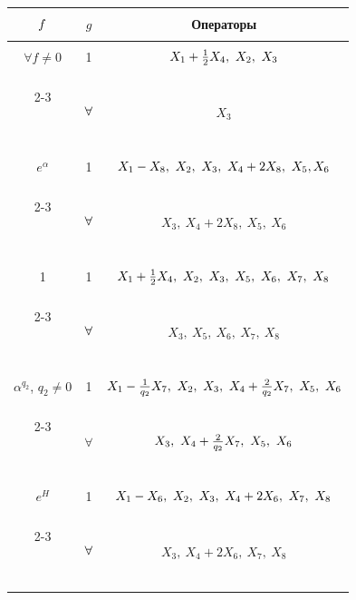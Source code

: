 \begin{center} 


\begin{tabular}{|c|c|c|} 


\hline 


$\myrule f$ & $g$ & Операторы \\ 


\hline 


$\forall f\ne0$ & 1 & $\myrule X_1+\frac12 X_4,\ X_2,\ X_3$ \\


\cline{2-3}


\ & $\myrule \forall$ & $X_3$\\


\hline


%


$e^\alpha$ & 1 & $\myrule X_1-X_8,\ X_2,\ X_3,\ X_4+2X_8,\ X_5, X_6$ \\


\cline{2-3} 


\ & $\myrule \forall$ & $X_3,\ X_4+2X_8,\ X_5,\ X_6$\\


\hline


%


1 & 1 & $\myrule X_1+\frac12 X_4,\ X_2,\ X_3,\ X_5,\ X_6,\ X_7,\ X_8$\\


\cline{2-3}


\ & $\myrule \forall$ & $X_3,\ X_5,\ X_6,\ X_7,\ X_8$\\


\hline


%


$\alpha^{q_2}$, $q_2\ne0$ & 1 &


$\myrule


X_1-\frac{1}{q_2}X_7,\ X_2,\ X_3,\ X_4+\frac{2}{q_2}X_7,\ X_5,\ X_6$ \\


\cline{2-3}


\ & $\forall$ & $\myrule X_3,\ X_4+\frac{2}{q_2}X_7,\ X_5,\ X_6$\\


\hline


%


$e^H$ & 1 & $\myrule X_1-X_6,\ X_2,\ X_3,\ X_4+2X_6,\ X_7,\ X_8$ \\


\cline{2-3}


\ & $\myrule \forall$ & $X_3,\ X_4+2X_6,\ X_7,\ X_8$\\


\hline


\end{tabular} 


\end{center} 






